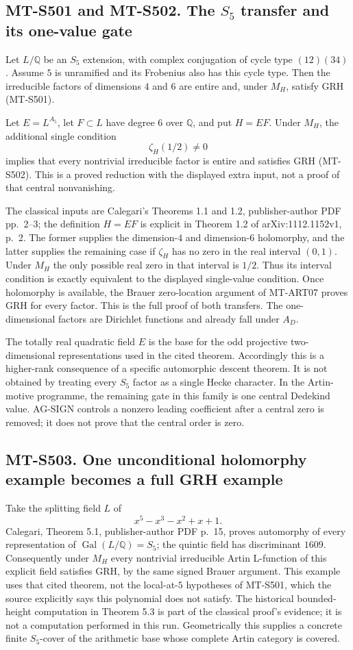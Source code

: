 \documentclass[11pt,a4paper]{article}
\begin{document}
\subsection*{MT-S501 and MT-S502. The $S_5$ transfer and its one-value gate}
Let $L/\mathbb Q$ be an $S_5$ extension, with complex conjugation of cycle
type $(12)(34)$. Assume $5$ is unramified and its Frobenius also has this
cycle type. Then the irreducible factors of dimensions $4$ and $6$ are
entire and, under $M_H$, satisfy GRH (MT-S501).

Let $E=L^{A_5}$, let $F\subset L$ have degree $6$ over $\mathbb Q$, and
put $H=EF$. Under $M_H$, the additional single condition
\[
                         \zeta_H(1/2)\ne0
\]
implies that every nontrivial irreducible factor is entire and satisfies
GRH (MT-S502). This is a proved reduction with the displayed extra input,
not a proof of that central nonvanishing.

The classical inputs are Calegari's Theorems 1.1 and 1.2,
publisher-author PDF pp.~2--3; the definition $H=EF$ is explicit in
Theorem 1.2 of arXiv:1112.1152v1, p.~2. The former supplies the
dimension-$4$ and dimension-$6$ holomorphy, and the latter supplies the
remaining case if $\zeta_H$ has no zero in the real interval $(0,1)$.
Under $M_H$ the only possible real zero in that interval is $1/2$.
Thus its interval condition is exactly equivalent to the displayed
single-value condition. Once holomorphy is available, the Brauer
zero-location argument of MT-ART07 proves GRH for every factor.
This is the full proof of both transfers. The one-dimensional factors
are Dirichlet functions and already fall under $A_D$.

The totally real quadratic field $E$ is the base for the odd projective
two-dimensional representations used in the cited theorem. Accordingly
this is a higher-rank consequence of a specific automorphic descent
theorem. It is not obtained by treating every $S_5$ factor as a single
Hecke character. In the Artin-motive programme, the remaining gate in
this family is one central Dedekind value. AG-SIGN controls a nonzero
leading coefficient after a central zero is removed; it does not prove
that the central order is zero.

\subsection*{MT-S503. One unconditional holomorphy example becomes a full GRH example}
Take the splitting field $L$ of
\[
                        x^5-x^3-x^2+x+1.
\]
Calegari, Theorem 5.1, publisher-author PDF p.~15, proves automorphy of
every representation of $\operatorname{Gal}(L/\mathbb Q)=S_5$;
the quintic field has discriminant $1609$. Consequently under $M_H$
every nontrivial irreducible Artin L-function of this explicit field
satisfies GRH, by the same signed Brauer argument. This example uses
that cited theorem, not the local-at-$5$ hypotheses of MT-S501, which
the source explicitly says this polynomial does not satisfy.
The historical bounded-height computation in Theorem 5.3 is part of
the classical proof's evidence; it is not a computation performed in
this run. Geometrically this supplies a concrete finite \(S_5\)-cover
of the arithmetic base whose complete Artin category is covered.
\end{document}
